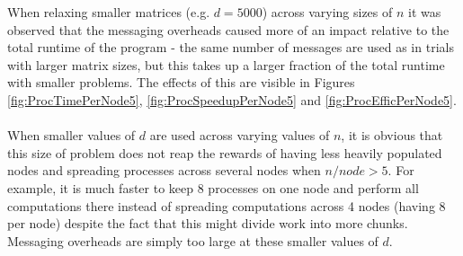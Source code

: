 \documentclass[11pt]{article}
\begin{document}
\begin{minipage}[t]{0.55\textwidth}
When relaxing smaller matrices (e.g. $d=5000$) across varying sizes of $n$ it was observed that the messaging overheads caused more of an impact relative to the total runtime of the program - the same number of messages are used as in trials with larger matrix sizes, but this takes up a larger fraction of the total runtime with smaller problems. The effects of this are visible in Figures  \ref{fig:ProcTimePerNode5}, \ref{fig:ProcSpeedupPerNode5} and \ref{fig:ProcEfficPerNode5}. 
\\
\\
When smaller values of $d$ are used across varying values of $n$, it is obvious that this size of problem does not reap the rewards of having less heavily populated nodes and spreading processes across several nodes when $n/node > 5$. For example, it is much faster to keep 8 processes on one node and perform all computations there instead of spreading computations across 4 nodes (having 8 per node) despite the fact that this might divide work into more chunks. Messaging overheads are simply too large at these smaller values of $d$.
\end{minipage}
\end{document}
